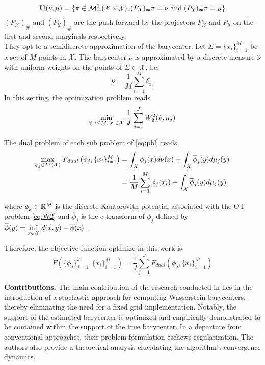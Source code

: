 $$ \textbf{U}(\nu, \mu) = \lbrace  \pi \in \mathcal{M}_+^1(\mathcal{X}\times\mathcal{Y}),  (P_\mathcal{X})_\# \pi = \nu\; \textrm{and}\; (P_\mathcal{Y} )_\# \pi = \mu  \rbrace $$
$(P_\mathcal{X} )_\#$ and $(P_\mathcal{Y} )_\#$ are the push-forward by the projectors $P_\mathcal{X}$ and $P_\mathcal{Y}$ on the first and second marginals respectively. \\

They opt to a semidiscrete approximation of the barycenter. Let $\Sigma = \lbrace x_i \rbrace_{i=1}^M$ be a set of $M$ points in $\mathcal{X}$. The barycenter $\nu$ is approximated by a discrete measure $\hat{\nu}$ with uniform weights on the points of $\Sigma\subset \mathcal{X}$, i.e.
$$ \hat{\nu} = \frac{1}{M} \sum_{i=1}^M \delta_{x_i} $$ 
In this setting, the optimization problem reads 
\begin{equation}\label{eq:pbl}
     \underset{\forall\ i \leq M,\; x_i \in \mathcal{X}}{\min}\; \frac{1}{J}\sum_{j=1}^{J} W_2^2(\hat{\nu}, \mu_j)
\end{equation}

The dual problem of each sub problem of \eqref{eq:pbl} reads 
\begin{align*}
 \underset{\phi_j \in L^1(\mathcal{X})}{\max}\; F_{dual}\left(\phi_j, \lbrace x_i \rbrace_{i=1}^M\right) &= \int_{\mathcal{X}} \phi_j(x)d\nu(x) + \int_{\mathcal{X}} \overline{\phi}_j(y) d\mu_j(y) \\
 &= \frac{1}{M}\sum_{i=1}^{M} \phi_j(x_i) + \int_{\mathcal{X}} \overline{\phi}_j(y) d\mu_j(y) \\
\end{align*}

where $\phi_j\in\mathbb{R}^{M}$ is the discrete Kantorovith potential associated with the OT problem \eqref{eq:W2} and $\overline{\phi}_j$ is the c-transform of $\phi_j$ defined by
$ \overline{\phi}(y) = \underset{x \in \mathcal{X}}{\inf}\; d(x, y) - \phi(x)$ \cite{peyre_computational_2020}. 

Therefore, the objective function optimize in this work \cite{claici_stochastic_2018} is 
\begin{equation}\label{eq:obj}
     F\left(\lbrace \phi_j\rbrace_{j=1}^J, \lbrace x_i \rbrace_{i=1}^M \right) = \frac{1}{J} \sum_{j=1}^{J} F_{dual}\left(\phi_j, \lbrace x_i \rbrace_{i=1}^M \right)
\end{equation}


\textbf{Contributions.} The main contribution of the research conducted in \cite{claici_stochastic_2018} lies in the introduction of a stochastic approach for computing Wasserstein barycenters, thereby eliminating the need for a fixed grid implementation. Notably, the support of the estimated barycenter is optimized and empirically demonstrated to be contained within the support of the true barycenter.  In a departure from conventional approaches, their problem formulation eschews regularization. The authors also provide a theoretical analysis elucidating the algorithm's convergence dynamics. \\ 

